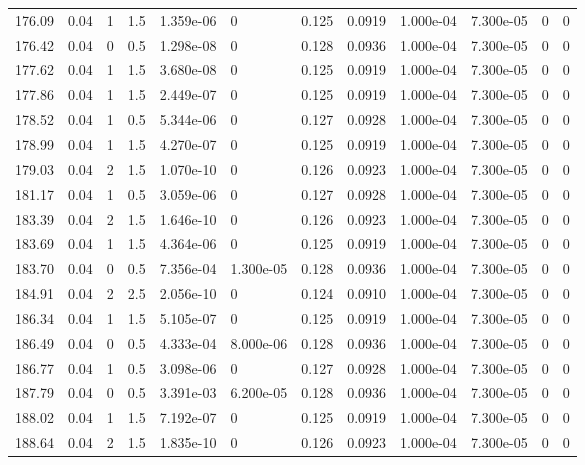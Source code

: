 \documentclass[preview]{standalone}
\begin{document}
{{{{{{\begin{tabular}{L{1.2cm}C{1.2cm} C{0.3cm}C{0.5cm} C{1.4cm}C{1.4cm} C{1.4cm}C{1.4cm} C{1.6cm}C{1.6cm} C{1.6cm}C{1.6cm}}
  176.09  &  0.04  & 1     & 1.5 &  1.359e-06  & 0  &  0.125&   0.0919& 1.000e-04 & 7.300e-05   &  0 & 0  \\ 
  176.42  &  0.04  & 0     & 0.5 &  1.298e-08  & 0  &  0.128&   0.0936& 1.000e-04 & 7.300e-05   &  0 & 0  \\ 
  177.62  &  0.04  & 1     & 1.5 &  3.680e-08  & 0  &  0.125&   0.0919& 1.000e-04 & 7.300e-05   &  0 & 0  \\ 
  177.86  &  0.04  & 1     & 1.5 &  2.449e-07  & 0  &  0.125&   0.0919& 1.000e-04 & 7.300e-05   &  0 & 0  \\ 
  178.52  &  0.04  & 1     & 0.5 &  5.344e-06  & 0  &  0.127&   0.0928& 1.000e-04 & 7.300e-05   &  0 & 0  \\ 
  178.99  &  0.04  & 1     & 1.5 &  4.270e-07  & 0  &  0.125&   0.0919& 1.000e-04 & 7.300e-05   &  0 & 0  \\ 
  179.03  &  0.04  & 2     & 1.5 &  1.070e-10  & 0  &  0.126&   0.0923& 1.000e-04 & 7.300e-05   &  0 & 0  \\ 
  181.17  &  0.04  & 1     & 0.5 &  3.059e-06  & 0  &  0.127&   0.0928& 1.000e-04 & 7.300e-05   &  0 & 0  \\ 
  183.39  &  0.04  & 2     & 1.5 &  1.646e-10  & 0  &  0.126&   0.0923& 1.000e-04 & 7.300e-05   &  0 & 0  \\ 
  183.69  &  0.04  & 1     & 1.5 &  4.364e-06  & 0  &  0.125&   0.0919& 1.000e-04 & 7.300e-05   &  0 & 0  \\ 
  183.70  &  0.04  & 0     & 0.5 &  7.356e-04  & 1.300e-05  &  0.128&   0.0936& 1.000e-04 & 7.300e-05   &  0 & 0  \\ 
  184.91  &  0.04  & 2     & 2.5 &  2.056e-10  & 0  &  0.124&   0.0910& 1.000e-04 & 7.300e-05   &  0 & 0  \\ 
  186.34  &  0.04  & 1     & 1.5 &  5.105e-07  & 0  &  0.125&   0.0919& 1.000e-04 & 7.300e-05   &  0 & 0  \\ 
  186.49  &  0.04  & 0     & 0.5 &  4.333e-04  & 8.000e-06  &  0.128&   0.0936& 1.000e-04 & 7.300e-05   &  0 & 0  \\ 
  186.77  &  0.04  & 1     & 0.5 &  3.098e-06  & 0  &  0.127&   0.0928& 1.000e-04 & 7.300e-05   &  0 & 0  \\ 
  187.79  &  0.04  & 0     & 0.5 &  3.391e-03  & 6.200e-05  &  0.128&   0.0936& 1.000e-04 & 7.300e-05   &  0 & 0  \\ 
  188.02  &  0.04  & 1     & 1.5 &  7.192e-07  & 0  &  0.125&   0.0919& 1.000e-04 & 7.300e-05   &  0 & 0  \\ 
  188.64  &  0.04  & 2     & 1.5 &  1.835e-10  & 0  &  0.126&   0.0923& 1.000e-04 & 7.300e-05   &  0 & 0  \\ 

\end{tabular}}}}}}}
\end{document}
